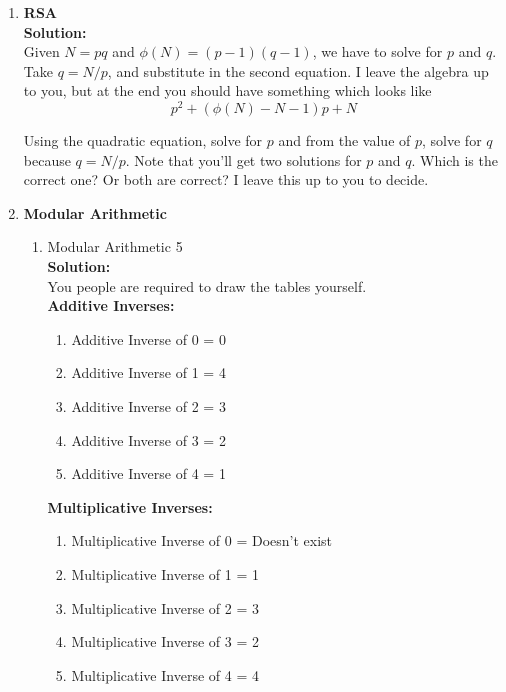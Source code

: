 \documentclass[11pt]{article}
\begin{document}
\begin{enumerate}
		
		\item \textbf{RSA} \\
		\textbf{Solution: } \\
		Given $N = pq$ and $\phi(N) = (p - 1)(q - 1)$, we have to solve for $p$ and $q$. Take $q = N / p$, and substitute in the second equation. I leave the algebra up to you, but at the end you should have something which looks like 
		$$ p^2 +  (\phi(N) - N - 1)p  + N  $$
		
		Using the quadratic equation, solve for $p$ and from the value of $p$, solve for $q$ because $q = N / p$. Note that you'll get two solutions for $p$ and $q$. Which is the correct one? Or both are correct? I leave this up to you to decide.  
		
		
		\item \textbf{Modular Arithmetic} 
			
			\begin{enumerate}
				\item Modular Arithmetic 5 \\
				\textbf{Solution: } \\
				You people are required to draw the tables yourself.\\
				\textbf{Additive Inverses: } 
					\begin{enumerate}
						\item Additive Inverse of 0 = 0
						\item Additive Inverse of 1 = 4
 						\item Additive Inverse of 2 = 3
						\item Additive Inverse of 3 = 2 
						\item Additive Inverse of 4 = 1
					\end{enumerate}
				
				\textbf{Multiplicative Inverses: }
					\begin{enumerate}
						\item Multiplicative Inverse of 0 = Doesn't exist
						\item Multiplicative Inverse of 1 = 1
						\item Multiplicative Inverse of 2 = 3
						\item Multiplicative Inverse of 3 = 2 
						\item Multiplicative Inverse of 4 = 4
					\end{enumerate}


\end{enumerate}
\end{enumerate}
\end{document}
